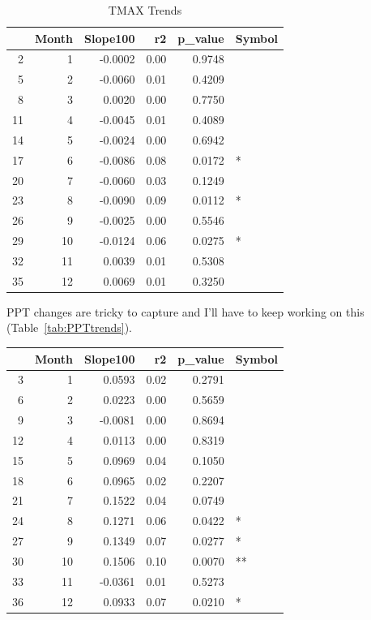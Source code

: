 \documentclass{article}\usepackage[]{graphicx}\usepackage[]{color}
\begin{document}
\begin{table}[ht]
\centering
\begin{tabular}{rrrrrl}
  \hline
 & Month & Slope100 & r2 & p\_value & Symbol \\ 
  \hline
2 & 1 & -0.0002 & 0.00 & 0.9748 &  \\ 
  5 & 2 & -0.0060 & 0.01 & 0.4209 &  \\ 
  8 & 3 & 0.0020 & 0.00 & 0.7750 &  \\ 
  11 & 4 & -0.0045 & 0.01 & 0.4089 &  \\ 
  14 & 5 & -0.0024 & 0.00 & 0.6942 &  \\ 
  17 & 6 & -0.0086 & 0.08 & 0.0172 & * \\ 
  20 & 7 & -0.0060 & 0.03 & 0.1249 &  \\ 
  23 & 8 & -0.0090 & 0.09 & 0.0112 & * \\ 
  26 & 9 & -0.0025 & 0.00 & 0.5546 &  \\ 
  29 & 10 & -0.0124 & 0.06 & 0.0275 & * \\ 
  32 & 11 & 0.0039 & 0.01 & 0.5308 &  \\ 
  35 & 12 & 0.0069 & 0.01 & 0.3250 &  \\ 
   \hline
\end{tabular}
\caption{TMAX Trends} 
\end{table}


PPT changes are tricky to capture and I'll have to keep working on this (Table~\ref{tab:PPTtrends}).

\begin{table}[ht]
\centering
\begin{tabular}{rrrrrl}
  \hline
 & Month & Slope100 & r2 & p\_value & Symbol \\ 
  \hline
3 & 1 & 0.0593 & 0.02 & 0.2791 &  \\ 
  6 & 2 & 0.0223 & 0.00 & 0.5659 &  \\ 
  9 & 3 & -0.0081 & 0.00 & 0.8694 &  \\ 
  12 & 4 & 0.0113 & 0.00 & 0.8319 &  \\ 
  15 & 5 & 0.0969 & 0.04 & 0.1050 &  \\ 
  18 & 6 & 0.0965 & 0.02 & 0.2207 &  \\ 
  21 & 7 & 0.1522 & 0.04 & 0.0749 &  \\ 
  24 & 8 & 0.1271 & 0.06 & 0.0422 & * \\ 
  27 & 9 & 0.1349 & 0.07 & 0.0277 & * \\ 
  30 & 10 & 0.1506 & 0.10 & 0.0070 & ** \\ 
  33 & 11 & -0.0361 & 0.01 & 0.5273 &  \\ 
  36 & 12 & 0.0933 & 0.07 & 0.0210 & * \\ 
   \hline
\end{tabular}
\end{table}
\end{document}

